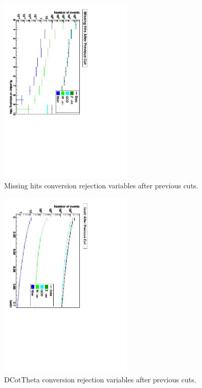  \begin{figure}[htb]
  \begin{center}
    \includegraphics[width=180pt, angle=90]{Figures/missHitsSeq.pdf}
  \end{center}
  \caption[Missing hits conversion rejection variables after previous cuts]{Missing hits conversion rejection variables after previous cuts.}
  \label{fig:MissHitsConvRejVars}
 \end{figure}

 \begin{figure}[htb]
  \begin{center}
    \includegraphics[width=180pt, angle=90]{Figures/dCotThetaSeq.pdf}
  \end{center}
  \caption[DCotTheta conversion rejection variables after previous cuts]{DCotTheta conversion rejection variables after previous cuts.}
  \label{fig:DCotConvRejVars}
 \end{figure}

